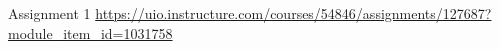 \begin{frame}{Assignment 1}
    \centering
    \url{https://uio.instructure.com/courses/54846/assignments/127687?module_item_id=1031758}
\end{frame}
